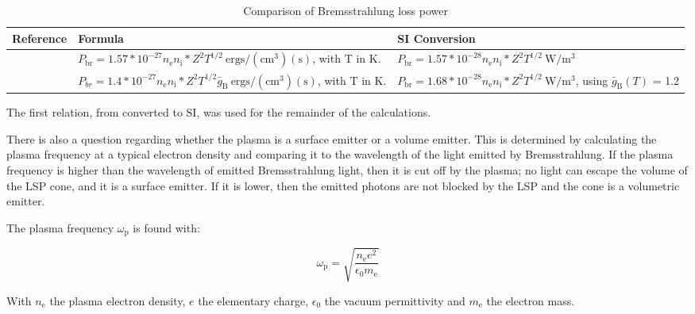         \begin{table}[!ht]
            \small
            \centering
            \caption{Comparison of Bremsstrahlung loss power}
            \label{tab:Brems_compare}
            \begin{tabularx}{\textwidth}{XXX}
            \toprule
            \textbf{Reference} & \textbf{Formula} & \textbf{SI Conversion} \\ \midrule
            \textcite{glasstoneControlledThermonuclearReactions1975}  & $P_\mathrm{br} = 1.57 * 10^{-27} n_\mathrm{e} n_\mathrm{i} *Z^2 T^{1/2} \: \mathrm{ergs/(cm^3)(s)}$, with T in K. &   $P_\mathrm{br} = 1.57 * 10^{-28} n_\mathrm{e} n_\mathrm{i} *Z^2 T^{1/2} \: \mathrm{W/m^3}$  \\
            \textcite{rybickiRadiativeProcessesAstrophysics2004}      & $P_{br} = 1.4 * 10^{-27} n_\mathrm{e} n_\mathrm{i} *Z^2 T^{1/2} \bar{g}_\mathrm{B} \: \mathrm{ergs/(cm^3)(s)}$, with T in K. &  $P_\mathrm{br} = 1.68 * 10^{-28} n_\mathrm{e} n_\mathrm{i} *Z^2 T^{1/2} \: \mathrm{W/m^3}$, using $\bar{g}_\mathrm{B} (T)$ = 1.2\\
            \bottomrule          
            \end{tabularx}
        \end{table}

        The first relation, from \textcite{glasstoneControlledThermonuclearReactions1975} converted to SI, was used for the remainder of the calculations.

        There is also a question regarding whether the plasma is a surface emitter or a volume emitter. This is determined by calculating the plasma frequency at a typical electron density and comparing it to the wavelength of the light emitted by Bremsstrahlung. If the plasma frequency is higher than the wavelength of emitted Bremsstrahlung light, then it is cut off by the plasma; no light can escape the volume of the LSP cone, and it is a surface emitter. If it is lower, then the emitted photons are not blocked by the LSP and the cone is a volumetric emitter.
        
        The plasma frequency $\omega_\mathrm{p}$ is found with: 

        \begin{equation}
            \omega_\mathrm{p} = \sqrt{\frac{n_\mathrm{e} e^2}{\epsilon_\mathrm{0} m_\mathrm{e}}}
        \end{equation}

        With $n_\mathrm{e}$ the plasma electron density, $e$ the elementary charge, $\epsilon_\mathrm{0}$ the vacuum permittivity and $m_\mathrm{e}$ the electron mass.

